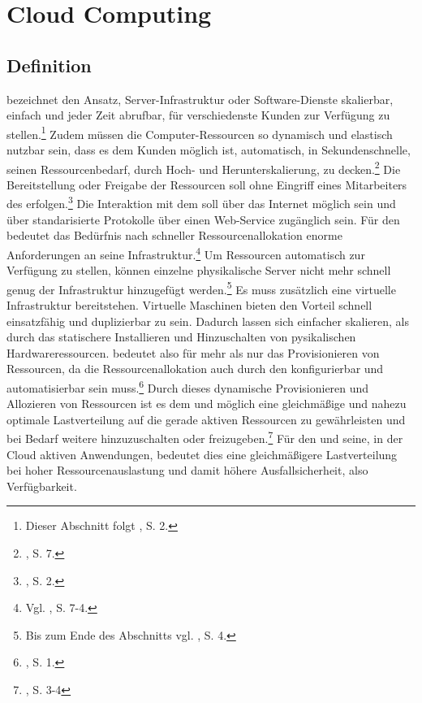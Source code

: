 \section{Cloud Computing}
\label{sec:Cloud}

\subsection{Definition}
\CC bezeichnet den Ansatz, Server-Infrastruktur oder Software-Dienste skalierbar, einfach und jeder Zeit abrufbar, für verschiedenste Kunden zur Verfügung zu stellen.\footnote{Dieser Abschnitt folgt \cite{Mell.2011}, S. 2.}
Zudem müssen die Computer-Ressourcen so dynamisch und elastisch nutzbar sein, dass es dem Kunden möglich ist, automatisch, in Sekundenschnelle, seinen Ressourcenbedarf, durch Hoch- und Herunterskalierung, zu decken.\footnote{\cite{Boss.2007}, S. 7.}
Die Bereitstellung oder Freigabe der Ressourcen soll ohne Eingriff eines Mitarbeiters des \CSPs erfolgen.\footnote{\cite{Mell.2011}, S. 2.}\saveFN{\Mell}
Die Interaktion mit dem \CS soll über das Internet möglich sein und über standarisierte Protokolle über einen Web-Service zugänglich sein.
Für den \CSP bedeutet das Bedürfnis nach schneller Ressourcenallokation enorme Anforderungen an seine \CC Infrastruktur.\footnote{Vgl. \cite{Badger.2011}, S. 7-4.} 
Um Ressourcen automatisch zur Verfügung zu stellen, können einzelne physikalische Server nicht mehr schnell genug der Infrastruktur hinzugefügt werden.\footnote{Bis zum Ende des Abschnitts vgl. \cite{Boss.2007}, S. 4.} 
Es muss zusätzlich eine virtuelle Infrastruktur bereitstehen.
Virtuelle Maschinen bieten den Vorteil schnell einsatzfähig und duplizierbar zu sein.
Dadurch lassen sich \CSs einfacher skalieren, als durch das statischere Installieren und Hinzuschalten von pysikalischen Hardwareressourcen.
\CC bedeutet also für \CSP mehr als nur das Provisionieren von Ressourcen, da die Ressourcenallokation auch durch den \CSU konfigurierbar und automatisierbar sein muss.\footnote{\cite{Xiao.2012}, S. 1.}
\newline
Durch dieses dynamische Provisionieren und Allozieren von Ressourcen ist es dem \CSP und \CSU  möglich eine gleichmäßige und nahezu optimale Lastverteilung auf die gerade aktiven Ressourcen zu gewährleisten und bei Bedarf weitere hinzuzuschalten oder freizugeben.\footnote{\cite{Xiao.2012}, S. 3-4} Für den \CSU und seine, in der Cloud aktiven Anwendungen, bedeutet dies eine gleichmäßigere Lastverteilung bei hoher Ressourcenauslastung und damit höhere Ausfallsicherheit, also Verfügbarkeit.

